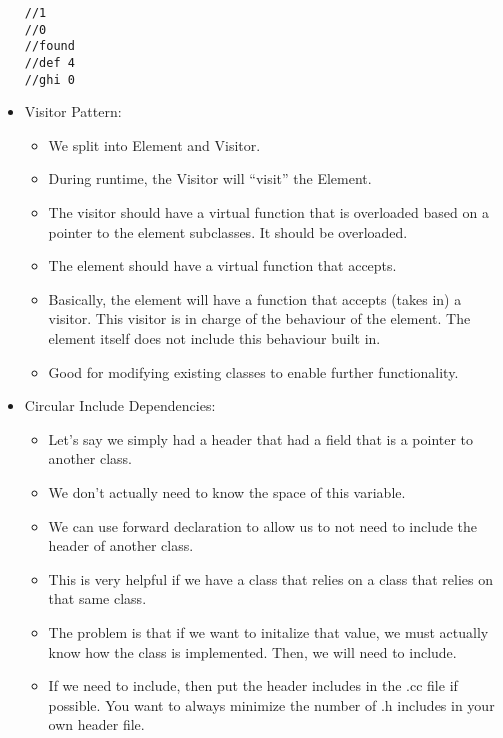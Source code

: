 \documentclass{article}
\begin{document}
\begin{itemize}
\begin{lstlisting}
//1
//0
//found
//def 4
//ghi 0
\end{lstlisting}
\item Visitor Pattern:
\begin{itemize}
\item We split into Element and Visitor.
\item During runtime, the Visitor will ``visit'' the Element.
\item The visitor should have a virtual function that is overloaded based on a pointer to the element subclasses.  It should be overloaded.
\item The element should have a virtual function that accepts.
\item Basically, the element will have a function that accepts (takes in) a visitor.  This visitor is in charge of the behaviour of the element.  The element itself does not include this behaviour built in.
\item Good for modifying existing classes to enable further functionality.
\end{itemize}

\item Circular Include Dependencies:
\begin{itemize}
\item Let's say we simply had a header that had a field that is a pointer to another class.
\item We don't actually need to know the space of this variable.  
\item We can use forward declaration to allow us to not need to include the header of another class.
\item This is very helpful if we have a class that relies on a class that relies on that same class.
\item The problem is that if we want to initalize that value, we must actually know how the class is implemented.  Then, we will need to include.
\item If we need to include, then put the header includes in the .cc file if possible.  You want to always minimize the number of .h includes in your own header file.
\end{itemize}

\end{itemize}
\end{document}
